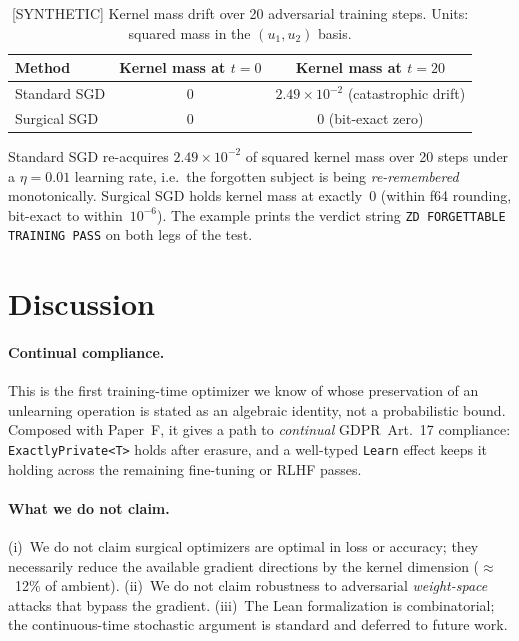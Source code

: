 \documentclass{article}
\begin{document}
\begin{table}[h]
  \centering
  \caption{[SYNTHETIC] Kernel mass drift over 20 adversarial training steps.
           Units: squared mass in the $(u_1,u_2)$ basis.}
  \label{tbl:drift}
  \begin{tabular}{lcc}
    \toprule
    Method & Kernel mass at $t=0$ & Kernel mass at $t=20$ \\
    \midrule
    Standard SGD  & $0$ & $2.49\times10^{-2}$ (catastrophic drift) \\
    Surgical SGD  & $0$ & $0$ (bit-exact zero)                    \\
    \bottomrule
  \end{tabular}
\end{table}

Standard SGD re-acquires $2.49\times10^{-2}$ of squared kernel mass
over 20 steps under a $\eta=0.01$ learning rate, i.e.~the forgotten
subject is being \emph{re-remembered} monotonically.  Surgical SGD
holds kernel mass at exactly~$0$ (within f64 rounding, bit-exact to
within~$10^{-6}$).  The example prints the verdict string
\texttt{ZD FORGETTABLE TRAINING PASS} on both legs of the test.

\section{Discussion}

\paragraph{Continual compliance.}
This is the first training-time optimizer we know of whose
preservation of an unlearning operation is stated as an algebraic
identity, not a probabilistic bound.  Composed with Paper~F, it
gives a path to \emph{continual} GDPR~Art.~17 compliance:
\texttt{ExactlyPrivate<T>} holds after erasure, and a well-typed
\texttt{Learn} effect keeps it holding across the remaining
fine-tuning or RLHF passes.

\paragraph{What we do not claim.}
(i)~We do not claim surgical optimizers are optimal in loss or
accuracy; they necessarily reduce the available gradient directions
by the kernel dimension ($\approx$~12\% of ambient). (ii)~We do not
claim robustness to adversarial \emph{weight-space} attacks that
bypass the gradient. (iii)~The Lean formalization is combinatorial;
the continuous-time stochastic argument is standard and deferred to
future work.
\end{document}
